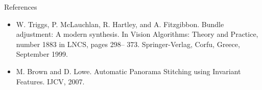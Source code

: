 \documentclass{beamer}
\begin{document}
\begin{frame}{References}
\begin{itemize}
\item W. Triggs, P. McLauchlan, R. Hartley, and A. Fitzgibbon. Bundle adjustment: A modern synthesis. In Vision Algorithms: Theory and Practice, number 1883 in LNCS, pages 298– 373. Springer-Verlag, Corfu, Greece, September 1999.
\item M. Brown and D. Lowe. Automatic Panorama Stitching using Invariant Features. IJCV, 2007.
\end{itemize}
\end{frame}
\end{document}

